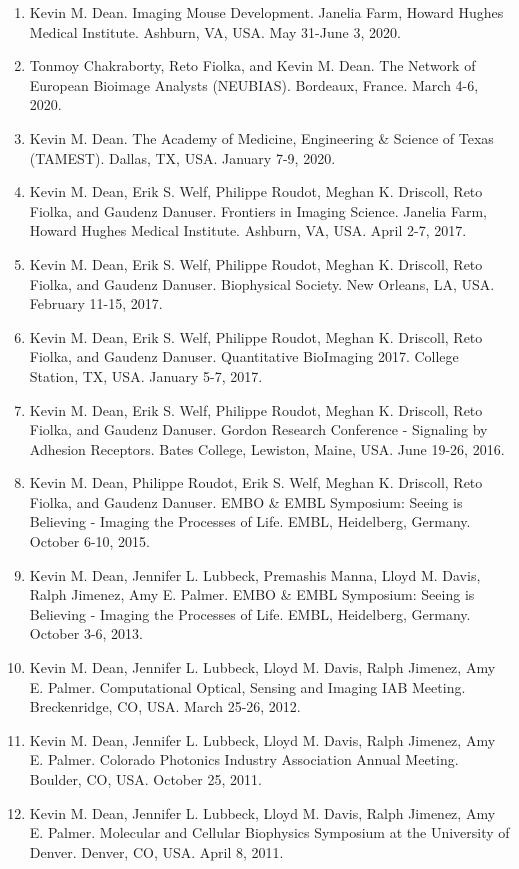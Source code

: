 \documentclass[10pt]{res}
\begin{document}
\begin{resume}
\begin{enumerate}
\item { Kevin M. Dean}.  Imaging Mouse Development.  Janelia Farm, Howard Hughes Medical Institute.  Ashburn, VA, USA. May 31-June 3, 2020.
\item Tonmoy Chakraborty, Reto Fiolka, and { Kevin M. Dean}.  The Network of European Bioimage Analysts (NEUBIAS).  Bordeaux, France. March 4-6, 2020.    
\item { Kevin M. Dean}.  The Academy of Medicine, Engineering \& Science of Texas (TAMEST).  Dallas, TX, USA.  January 7-9, 2020.  
\item { Kevin M. Dean}, Erik S. Welf, Philippe Roudot, Meghan K. Driscoll, Reto Fiolka, and Gaudenz Danuser.  Frontiers in Imaging Science.  Janelia Farm, Howard Hughes Medical Institute.  Ashburn, VA, USA.  April 2-7, 2017.  
\item { Kevin M. Dean}, Erik S. Welf, Philippe Roudot, Meghan K. Driscoll, Reto Fiolka, and Gaudenz Danuser.  Biophysical Society.  New Orleans, LA, USA.  February 11-15, 2017.  
\item { Kevin M. Dean}, Erik S. Welf, Philippe Roudot, Meghan K. Driscoll, Reto Fiolka, and Gaudenz Danuser.  Quantitative BioImaging 2017.  College Station, TX, USA. January 5-7, 2017.  
\item { Kevin M. Dean}, Erik S. Welf, Philippe Roudot, Meghan K. Driscoll, Reto Fiolka, and Gaudenz Danuser.  Gordon Research Conference - Signaling by Adhesion Receptors.  Bates College, Lewiston, Maine, USA.  June 19-26, 2016. 
\item { Kevin M. Dean}, Philippe Roudot, Erik S. Welf, Meghan K. Driscoll, Reto Fiolka, and Gaudenz Danuser.  EMBO \& EMBL Symposium: Seeing is Believing - Imaging the Processes of Life.  EMBL, Heidelberg, Germany.  October 6-10, 2015.  
\item { Kevin M. Dean}, Jennifer L. Lubbeck, Premashis Manna, Lloyd M. Davis, Ralph Jimenez, Amy E. Palmer.  EMBO \& EMBL Symposium: Seeing is Believing - Imaging the Processes of Life.  EMBL, Heidelberg, Germany.  October 3-6, 2013.  
\item { Kevin M. Dean}, Jennifer L. Lubbeck, Lloyd M. Davis, Ralph Jimenez, Amy E. Palmer.  Computational Optical, Sensing and Imaging IAB Meeting.  Breckenridge, CO, USA.  March 25-26, 2012.  
\item { Kevin M. Dean}, Jennifer L. Lubbeck, Lloyd M. Davis, Ralph Jimenez, Amy E. Palmer.  Colorado Photonics Industry Association Annual Meeting.  Boulder, CO, USA.  October 25, 2011.  
\item { Kevin M. Dean}, Jennifer L. Lubbeck, Lloyd M. Davis, Ralph Jimenez, Amy E. Palmer.  Molecular and Cellular Biophysics Symposium at the University of Denver.  Denver, CO, USA.  April 8, 2011.  

\end{enumerate}
\end{resume}
\end{document}

